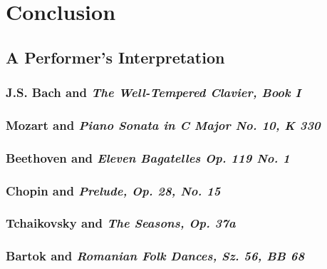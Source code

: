 \chapter*{Conclusion}\label{conclusion}

\section*{A Performer's Interpretation}

\subsection*{J.S. Bach and \textit{The Well-Tempered Clavier, Book I}}

\subsection*{Mozart and \textit{Piano Sonata in C Major No. 10, K 330}}

\subsection*{Beethoven and \textit{Eleven Bagatelles Op. 119 No. 1}}

\subsection*{Chopin and \textit{Prelude, Op. 28, No. 15}}\label{subsection:chopin-intepretation}

\subsection*{Tchaikovsky and \textit{The Seasons, Op. 37a}}

\subsection*{Bartok and \textit{Romanian Folk Dances, Sz. 56, BB 68}}
